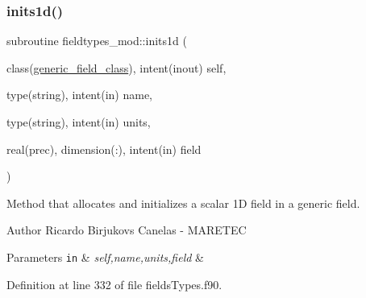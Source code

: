 \subsubsection{\texorpdfstring{inits1d()}{inits1d()}}
{\footnotesize\ttfamily subroutine fieldtypes\+\_\+mod\+::inits1d (\begin{DoxyParamCaption}\item[{class(\mbox{\hyperlink{structfieldtypes__mod_1_1generic__field__class}{generic\+\_\+field\+\_\+class}}), intent(inout)}]{self,  }\item[{type(string), intent(in)}]{name,  }\item[{type(string), intent(in)}]{units,  }\item[{real(prec), dimension(\+:), intent(in)}]{field }\end{DoxyParamCaption})\hspace{0.3cm}{\ttfamily [private]}}



Method that allocates and initializes a scalar 1D field in a generic field. 

\begin{DoxyAuthor}{Author}
Ricardo Birjukovs Canelas -\/ M\+A\+R\+E\+T\+EC 
\end{DoxyAuthor}

\begin{DoxyParams}[1]{Parameters}
\mbox{\tt in}  & {\em self,name,units,field} & \\
\hline
\end{DoxyParams}


Definition at line 332 of file fields\+Types.\+f90.


